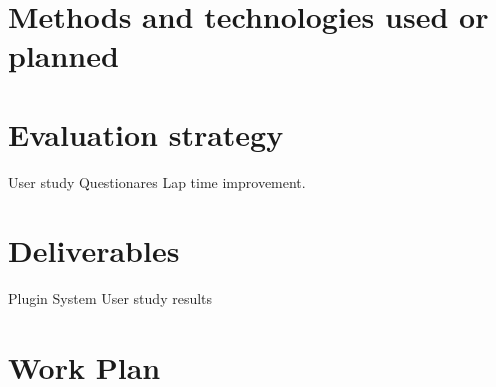 \documentclass{article}
\begin{document}
\section{Methods and technologies used or planned}

\section{Evaluation strategy}

User study
Questionares
Lap time improvement.

\section{Deliverables}

Plugin System
User study results

\section{Work Plan}


\newpage
{}

\end{document}
